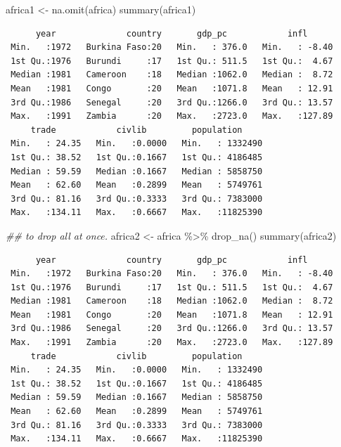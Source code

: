 \documentclass[
  letterpaper,
  DIV=11,
  numbers=noendperiod]{scrreprt}
\newenvironment{Shaded}{\begin{snugshade}}{\end{snugshade}}
\newcommand{\DocumentationTok}[1]{\textcolor[rgb]{0.37,0.37,0.37}{\textit{#1}}}
\newcommand{\FunctionTok}[1]{\textcolor[rgb]{0.28,0.35,0.67}{#1}}
\newcommand{\NormalTok}[1]{\textcolor[rgb]{0.00,0.23,0.31}{#1}}
\newcommand{\OtherTok}[1]{\textcolor[rgb]{0.00,0.23,0.31}{#1}}
\newcommand{\SpecialCharTok}[1]{\textcolor[rgb]{0.37,0.37,0.37}{#1}}
\begin{document}
\begin{Shaded}
\begin{Highlighting}[]
\NormalTok{africa1 }\OtherTok{\textless{}{-}} \FunctionTok{na.omit}\NormalTok{(africa)}
\FunctionTok{summary}\NormalTok{(africa1)}
\end{Highlighting}
\end{Shaded}

\begin{verbatim}
      year              country       gdp_pc            infl       
 Min.   :1972   Burkina Faso:20   Min.   : 376.0   Min.   : -8.40  
 1st Qu.:1976   Burundi     :17   1st Qu.: 511.5   1st Qu.:  4.67  
 Median :1981   Cameroon    :18   Median :1062.0   Median :  8.72  
 Mean   :1981   Congo       :20   Mean   :1071.8   Mean   : 12.91  
 3rd Qu.:1986   Senegal     :20   3rd Qu.:1266.0   3rd Qu.: 13.57  
 Max.   :1991   Zambia      :20   Max.   :2723.0   Max.   :127.89  
     trade            civlib         population      
 Min.   : 24.35   Min.   :0.0000   Min.   : 1332490  
 1st Qu.: 38.52   1st Qu.:0.1667   1st Qu.: 4186485  
 Median : 59.59   Median :0.1667   Median : 5858750  
 Mean   : 62.60   Mean   :0.2899   Mean   : 5749761  
 3rd Qu.: 81.16   3rd Qu.:0.3333   3rd Qu.: 7383000  
 Max.   :134.11   Max.   :0.6667   Max.   :11825390  
\end{verbatim}

\begin{Shaded}
\begin{Highlighting}[]
\DocumentationTok{\#\# to drop all at once.}
\NormalTok{africa2 }\OtherTok{\textless{}{-}}\NormalTok{ africa }\SpecialCharTok{\%\textgreater{}\%}
    \FunctionTok{drop\_na}\NormalTok{()}
\FunctionTok{summary}\NormalTok{(africa2)}
\end{Highlighting}
\end{Shaded}

\begin{verbatim}
      year              country       gdp_pc            infl       
 Min.   :1972   Burkina Faso:20   Min.   : 376.0   Min.   : -8.40  
 1st Qu.:1976   Burundi     :17   1st Qu.: 511.5   1st Qu.:  4.67  
 Median :1981   Cameroon    :18   Median :1062.0   Median :  8.72  
 Mean   :1981   Congo       :20   Mean   :1071.8   Mean   : 12.91  
 3rd Qu.:1986   Senegal     :20   3rd Qu.:1266.0   3rd Qu.: 13.57  
 Max.   :1991   Zambia      :20   Max.   :2723.0   Max.   :127.89  
     trade            civlib         population      
 Min.   : 24.35   Min.   :0.0000   Min.   : 1332490  
 1st Qu.: 38.52   1st Qu.:0.1667   1st Qu.: 4186485  
 Median : 59.59   Median :0.1667   Median : 5858750  
 Mean   : 62.60   Mean   :0.2899   Mean   : 5749761  
 3rd Qu.: 81.16   3rd Qu.:0.3333   3rd Qu.: 7383000  
 Max.   :134.11   Max.   :0.6667   Max.   :11825390  
\end{verbatim}
\end{document}

